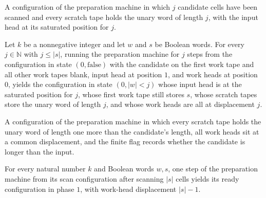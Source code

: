 \begin{definition}
\label{Turing.FinTM.splitPrepareScan}
\leanok
{}
A configuration of the preparation machine in which $j$ candidate cells have
been scanned and every scratch tape holds the unary word of length $j$, with
the input head at its saturated position for $j$.
\end{definition}

\begin{lemma}
\label{Turing.FinTM.splitPrepare_scan}
\leanok
{}
Let $k$ be a nonnegative integer and let $w$ and $s$ be Boolean words. For every
$j\in\mathbb N$ with $j\le |s|$, running the preparation machine for $j$ steps from the
configuration in state $(0,\mathrm{false})$ with the candidate on the first work tape
and all other work tapes blank, input head at position $1$, and work heads at position
$0$, yields the configuration in state $(0,|w|<j)$ whose input head is at the saturated
position for $j$, whose first work tape still stores $s$, whose scratch tapes store the
unary word of length $j$, and whose work heads are all at displacement $j$.
\end{lemma}

\begin{definition}
\label{Turing.FinTM.splitPrepareReady}
\leanok
{}
A configuration of the preparation machine in which every scratch tape holds
the unary word of length one more than the candidate's length, all work
heads sit at a common displacement, and the finite flag records whether the
candidate is longer than the input.
\end{definition}

\begin{lemma}
\label{Turing.FinTM.splitPrepare_extra}
\leanok
{}
For every natural number $k$ and Boolean words $w,s$, one step of the preparation
machine from its scan configuration after scanning $|s|$ cells yields its ready
configuration in phase $1$, with work-head displacement $|s|-1$.
\end{lemma}

